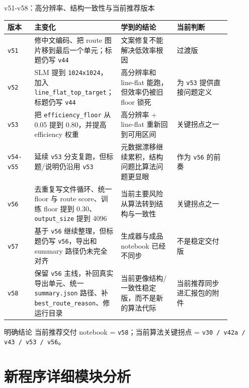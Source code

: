 \documentclass[aspectratio=169,10pt]{ctexbeamer}
\begin{document}
\begin{frame}{v51-v58：高分辨率、结构一致性与当前推荐版本}
  \scriptsize
  \begin{tabular}{>{\raggedright\arraybackslash}p{0.12\linewidth} >{\raggedright\arraybackslash}p{0.27\linewidth} >{\raggedright\arraybackslash}p{0.25\linewidth} >{\raggedright\arraybackslash}p{0.24\linewidth}}
    \toprule
    版本 & 主变化 & 学到的结论 & 当前判断 \\
    \midrule
    \texttt{v51} & 修中文编码、把 route 图片移到最后一个单元；标题仍写 \texttt{v44} & 文案修复不能解决低效率根因 & 过渡版 \\
    \texttt{v52} & SLM 提到 \texttt{1024x1024}，加入 \texttt{line\_flat\_top\_target}；标题仍写 \texttt{v44} & 高分辨率和 line-flat 能跑，但效率仍被旧 floor 锁死 & 为 \texttt{v53} 提供直接问题定义 \\
    \texttt{v53} & 把 \texttt{efficiency\_floor} 从 0.05 提到 0.80，并提高 efficiency 权重 & 高分辨率 + line-flat 重新回到可用区间 & 关键拐点之一 \\
    \texttt{v54-v55} & 延续 \texttt{v53} 分支复跑，但标题/说明仍沿用 \texttt{v53} & 元数据漂移继续累积，结构问题比算法问题更显眼 & 作为 \texttt{v56} 的前奏 \\
    \texttt{v56} & 去重复写文件循环、统一 floor 与 route score、训练 floor 提到 0.30、\texttt{output\_size} 提到 4096 & 当前主要风险从算法转到结构与一致性 & 关键拐点之一 \\
    \texttt{v57} & 基于 \texttt{v56} 继续整理，但标题仍写 \texttt{v56}，导出和 summary 路径仍未完全对齐 & 生成器与成品 notebook 已经不同步 & 不是稳定交付版 \\
    \texttt{v58} & 保留 \texttt{v56} 主线，补回真实导出单元、统一 \texttt{summary.json} 路径、补 \texttt{best\_route\_reason}、修运行目录 & 当前更像结构/一致性稳定版，而不是新的算法代际 & 当前推荐同步进汇报包的附件 \\
    \bottomrule
  \end{tabular}

  \vspace{0.5em}
  \begin{block}{明确结论}
    当前推荐交付 notebook = \texttt{v58}；当前算法关键拐点 = \texttt{v30 / v42a / v43 / v53 / v56}。
  \end{block}
\end{frame}

\section{新程序详细模块分析}
\end{document}
